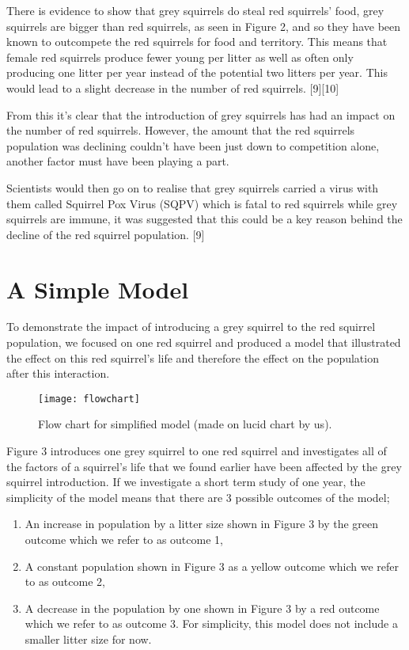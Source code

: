 \documentclass{article}
\begin{document}
There is evidence to show that grey squirrels do steal red squirrels’ food, grey squirrels are bigger than red squirrels, as seen in Figure 2, and so they have been known to outcompete the red squirrels for food and territory. This means that female red squirrels produce fewer young per litter as well as often only producing one litter per year instead of the potential two litters per year. This would lead to a slight decrease in the number of red squirrels. [9][10]

From this it’s clear that the introduction of grey squirrels has had an impact on the number of red squirrels. However, the amount that the red squirrels population was declining couldn't have been just down to competition alone, another factor must have been playing a part. 

Scientists would then go on to realise that grey squirrels carried a virus with them called Squirrel Pox Virus (SQPV) which is fatal to red squirrels while grey squirrels are immune, it was suggested that this could be a key reason behind the decline of the red squirrel population. [9]




\section{A Simple Model}

To demonstrate the impact of introducing a grey squirrel to the red squirrel population, we focused on one red squirrel and produced a model that illustrated the effect on this red squirrel’s life and therefore the effect on the population after this interaction.

\begin{figure}[H]
\begin{center}
\texttt{[image: flowchart]}
\caption{Flow chart for simplified model (made on lucid chart by us).}
\end{center}
\end{figure}

Figure 3 introduces one grey squirrel to one red squirrel and investigates all of the factors of a squirrel’s life that we found earlier have been affected by the grey squirrel introduction. If we investigate a short term study of one year, the simplicity of the model means that there are 3 possible outcomes of the model;

\begin{enumerate}
\item An increase in population by a litter size shown in Figure 3 by the green outcome which we refer to as outcome 1, 
\item A constant population shown in Figure 3 as a yellow outcome which we refer to as outcome 2, 
\item A decrease in the population by one shown in Figure 3 by a red outcome which we refer to as outcome 3. For simplicity, this model does not include a smaller litter size for now.
\end{enumerate}
\end{document}
